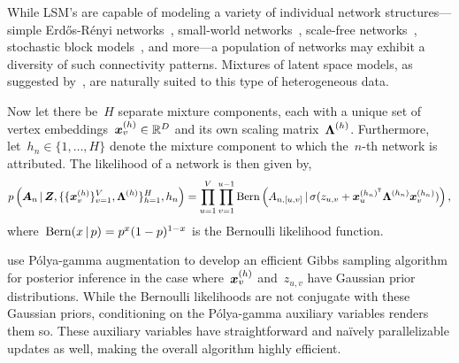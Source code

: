 While LSM's are capable of modeling a variety of individual network
structures---simple Erd\H{o}s-R\'{e}nyi
networks~\citep{erdos1959random}, small-world
networks~\citep{watts1998collective}, scale-free
networks~\citep{barabasi1999emergence}, stochastic block
models~\citep{nowicki2001estimation, airoldi2008mixed}, and more---a
population of networks may exhibit a diversity of such connectivity
patterns.  Mixtures of latent space models, as suggested
by~\citet{durante2016nonparametric}, are naturally suited to this type
of heterogeneous data.

Now let there
be~$H$ separate mixture components, each with 
a unique set of vertex embeddings~${\boldsymbol{x}_v^{(h)} \in \mathbb{R}^D}$
and its own scaling matrix~$\boldsymbol{\Lambda}^{(h)}$. Furthermore,
let~${h_n \in \{1, \ldots, H\}}$ denote the mixture component
to which the~$n$-th network is attributed. 
The likelihood of a network is then
given by,
\begin{align}
  \label{eq:molsm_lkhd}
  p \left(\boldsymbol{A}_n \, | \,
    \boldsymbol{Z}, \{\{\boldsymbol{x}_v^{(h)}\}_{v=1}^V,
  \boldsymbol{\Lambda}^{(h)}\}_{h=1}^H, h_n \right) 
  = \prod_{u=1}^V \prod_{v=1}^{u-1}
  \mathrm{Bern} \left(A_{n,[u,v]} \, | \,
    \sigma(z_{u,v} + \boldsymbol{x}_{u}^{(h_n)^{\mathsf{T}}} \boldsymbol{\Lambda}^{(h_n)} \boldsymbol{x}_v^{(h_n)}) \right),
\end{align}
where~${\mathrm{Bern}(x \, | \, p) = p^x (1-p)^{1-x}}$ is the Bernoulli likelihood function.

\citet{durante2016nonparametric} use
P\'{o}lya-gamma augmentation to develop an
efficient Gibbs sampling algorithm for posterior inference in the case
where~$\boldsymbol{x}_v^{(h)}$ and~$z_{u,v}$ have Gaussian prior distributions. 
While the Bernoulli likelihoods are not conjugate with these Gaussian
priors, conditioning on the P\'{o}lya-gamma auxiliary variables renders them so.
These auxiliary variables have straightforward and na\"{i}vely parallelizable
updates as well, making the overall algorithm highly efficient.


